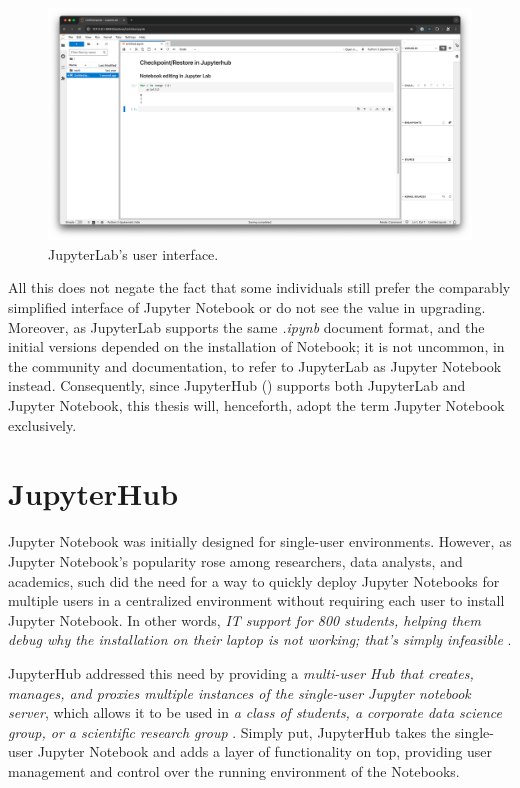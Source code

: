 \documentclass[
  digital,     %
  oneside,     %
  nosansbold,  %
  nocolorbold, %
  lof,         %
  nolot,         %
]{fithesis4}
\begin{document}
\begin{figure}[H]
  \begin{center}
  \includegraphics[width=\textwidth]{figures/jupyter-lab-extended-screenshot.png}
  \end{center}
  \caption{JupyterLab's user interface.}
  \label{fig:jupyter-lab-screenshot}
\end{figure}

All this does not negate the fact that some individuals still prefer the comparably simplified interface of Jupyter Notebook or do not see the value in upgrading. Moreover, as JupyterLab supports the same \emph{.ipynb} document format, and the initial versions depended on the installation of Notebook; it is not uncommon, in the community and documentation, to refer to JupyterLab as Jupyter Notebook instead. Consequently, since JupyterHub () supports both JupyterLab and Jupyter Notebook, this thesis will, henceforth, adopt the term Jupyter Notebook exclusively.

\section{JupyterHub}
\label{sec:jupyterhub}
Jupyter Notebook was initially designed for single-user environments. However, as Jupyter Notebook's popularity rose among researchers, data analysts, and academics, such did the need for a way to quickly deploy Jupyter Notebooks for multiple users in a centralized environment without requiring each user to install Jupyter Notebook. In other words, \emph{IT support for 800 students, helping them debug why the installation on their laptop is not working; that's simply infeasible} \cite{perkel2018jupyter}.

JupyterHub addressed this need by providing a \emph{multi-user Hub that creates, manages, and proxies multiple instances of the single-user Jupyter notebook server}, which allows it to be used in \emph{a class of students, a corporate data science group, or a scientific research group} \cite{jupyterhub}. Simply put, JupyterHub takes the single-user Jupyter Notebook and adds a layer of functionality on top, providing user management and control over the running environment of the Notebooks.
\end{document}
